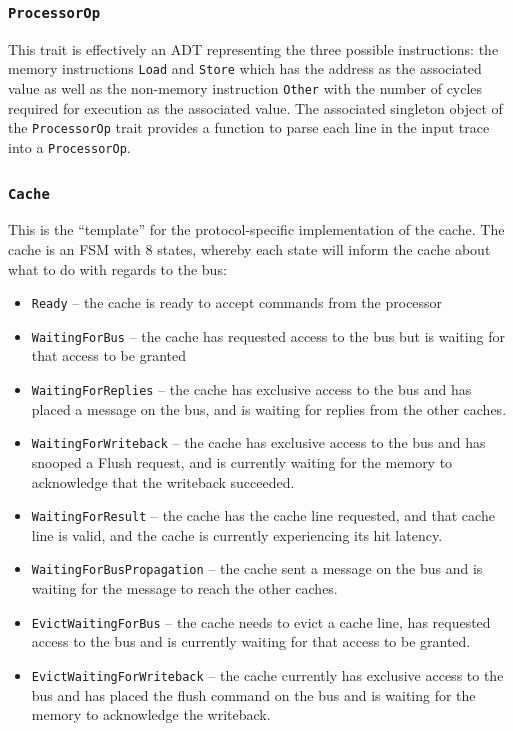 \documentclass[nonacm,acmsmall,screen,11pt]{acmart}
\begin{document}
\subsubsection{\texttt{ProcessorOp}}
This trait is effectively an ADT representing the three possible instructions: the memory instructions \texttt{Load} and \texttt{Store} which has the address as the associated value as well as the non-memory instruction \texttt{Other} with the number of cycles required for execution as the associated value.
The associated singleton object of the \texttt{ProcessorOp} trait provides a function to parse each line in the input trace into a \texttt{ProcessorOp}.

\subsubsection{\texttt{Cache}}
This is the ``template'' for the protocol-specific implementation of the cache.
The cache is an FSM with 8 states, whereby each state will inform the cache about what to do with regards to the bus:
\begin{itemize}
  \item \texttt{Ready} -- the cache is ready to accept commands from the processor
  \item \texttt{WaitingForBus} -- the cache has requested access to the bus but is waiting for that access to be granted
  \item \texttt{WaitingForReplies} -- the cache has exclusive access to the bus and has placed a message on the bus, and is waiting for replies from the other caches.
  \item \texttt{WaitingForWriteback} -- the cache has exclusive access to the bus and has snooped a Flush request, and is currently waiting for the memory to acknowledge that the writeback succeeded.
  \item \texttt{WaitingForResult} -- the cache has the cache line requested, and that cache line is valid, and the cache is currently experiencing its hit latency.
  \item \texttt{WaitingForBusPropagation} -- the cache sent a message on the bus and is waiting for the message to reach the other caches.
  \item \texttt{EvictWaitingForBus} -- the cache needs to evict a cache line, has requested access to the bus and is currently waiting for that access to be granted.
  \item \texttt{EvictWaitingForWriteback} -- the cache currently has exclusive access to the bus and has placed the flush command on the bus and is waiting for the memory to acknowledge the writeback.
\end{itemize}
\end{document}
